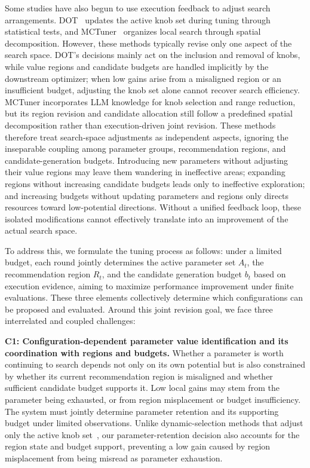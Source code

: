 \documentclass[runningheads]{llncs}
\begin{document}
Some studies have also begun to use execution feedback to adjust search
arrangements. DOT~\cite{dot} updates the active knob set during tuning
through statistical tests, and MCTuner~\cite{mctuner} organizes local
search through spatial decomposition. However, these methods typically
revise only one aspect of the search space. DOT's decisions mainly act on
the inclusion and removal of knobs, while value regions and candidate
budgets are handled implicitly by the downstream optimizer; when low
gains arise from a misaligned region or an insufficient budget,
adjusting the knob set alone cannot recover search efficiency. MCTuner
incorporates LLM knowledge for knob selection and range reduction, but
its region revision and candidate allocation still follow a predefined
spatial decomposition rather than execution-driven joint revision. These
methods therefore treat search-space adjustments as independent aspects,
ignoring the inseparable coupling among parameter groups, recommendation
regions, and candidate-generation budgets. Introducing new parameters
without adjusting their value regions may leave them wandering in
ineffective areas; expanding regions without increasing candidate budgets
leads only to ineffective exploration; and increasing budgets without
updating parameters and regions only directs resources toward
low-potential directions. Without a unified feedback loop, these isolated
modifications cannot effectively translate into an improvement of the
actual search space.

To address this, we formulate the tuning process as follows: under a
limited budget, each round jointly determines the active parameter set
\(A_t\), the recommendation region \(R_t\), and the candidate generation
budget \(b_t\) based on execution evidence, aiming to maximize performance
improvement under finite evaluations. These three elements collectively
determine which configurations can be proposed and evaluated. Around this
joint revision goal, we face three interrelated and coupled challenges:

\textbf{C1: Configuration-dependent parameter value identification and
its coordination with regions and budgets.} Whether a parameter is worth
continuing to search depends not only on its own potential but is also
constrained by whether its current recommendation region is misaligned
and whether sufficient candidate budget supports it. Low local gains may
stem from the parameter being exhausted, or from region misplacement or
budget insufficiency. The system must jointly determine parameter
retention and its supporting budget under limited observations. Unlike
dynamic-selection methods that adjust only the active knob
set~\cite{dot}, our parameter-retention decision also accounts for the
region state and budget support, preventing a low gain caused by region
misplacement from being misread as parameter exhaustion.
\end{document}
